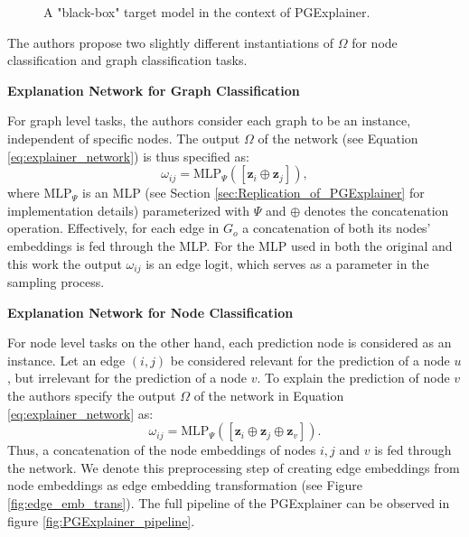 \begin{figure}
\begin{tikzpicture}
    \end{tikzpicture}
    \caption["Black-box" target model in PGExplainer context]{A "black-box" target model in the context of PGExplainer.}
    \label{fig:blackbox_downstream_model}
\end{figure}

The authors propose two slightly different instantiations of $\Omega$ for node classification and graph classification tasks. \bigskip

\textbf{Explanation Network for Graph Classification}\par
For graph level tasks, the authors consider each graph to be an instance, independent  of specific nodes. The output $\Omega$ of the network (see Equation \ref{eq:explainer_network}) is thus specified as:
\begin{equation}
    \label{eq:mlp_graph_input}
    \omega_{ij} = \text{MLP}_\Psi ([\mathbf{z}_i\oplus\mathbf{z}_j]),
\end{equation}
where $\text{MLP}_\Psi$ is an MLP (see Section \ref{sec:Replication_of_PGExplainer} for implementation details) parameterized with $\Psi$ and $\oplus$ denotes the concatenation operation. Effectively, for each edge in $G_o$ a concatenation of both its nodes' embeddings is fed through the MLP. For the MLP used in both the original and this work the output $\omega_{ij}$ is an edge logit, which serves as a parameter in the sampling process. \bigskip

\textbf{Explanation Network for Node Classification}\par
For node level tasks on the other hand, each prediction node is considered as an instance. Let an edge $(i,j)$ be considered relevant for the prediction of a node $u$, but irrelevant for the prediction of a node $v$. To explain the prediction of node $v$ the authors specify the output $\Omega$ of the network in Equation \ref{eq:explainer_network} as:
\begin{equation}
    \omega_{ij} = \text{MLP}_\Psi ([\mathbf{z}_i\oplus\mathbf{z}_j\oplus\mathbf{z}_v]).
\end{equation}
Thus, a concatenation of the node embeddings of nodes $i, j$ and $v$ is fed through the network. We denote this preprocessing step of creating edge embeddings from node embeddings as edge embedding transformation (see Figure \ref{fig:edge_emb_trans}). The full pipeline of the PGExplainer can be observed in figure \ref{fig:PGExplainer_pipeline}. \bigskip

